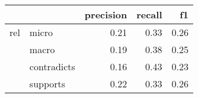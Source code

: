 \begin{tabular}{llrrr}
\toprule
    &          &  precision &  recall &   f1 \\
\midrule
rel & micro &       0.21 &    0.33 & 0.26 \\
    & macro &       0.19 &    0.38 & 0.25 \\
    & contradicts &       0.16 &    0.43 & 0.23 \\
    & supports &       0.22 &    0.33 & 0.26 \\
\bottomrule
\end{tabular}
